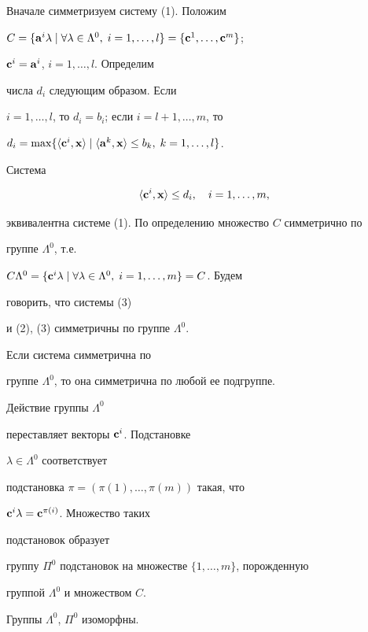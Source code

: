 Вначале симметризуем систему (1). Положим


$C=\{\bold a^i\lambda\mid\forall\lambda\in\Lambda^0,\;


i=1,\dotsc,l\}=\{\bold c^1,\dotsc,\bold c^m\}$;


$\bold c^i=\bold a^i$, $i=1,\dotsc,l$. Определим


числа $d_i$ следующим образом. Если


$i=1,\dotsc,l$, то $d_i=b_i$; если $i=l+1,\dotsc,m$, то


$d_i=\max\{\la\bold c^i,\bold x\ra\mid\la\bold a^k,\bold x\ra\le b_k,\;


k=1,\dotsc,l\}$.


Система


\begin{equation}


\la\bold c^i,\bold x\ra\le d_i,\quad i=1,\dotsc,m,


\end{equation}


эквивалентна системе (1). По определению множество $C$ симметрично по


группе $\Lambda^0$, т.е.


$C\Lambda^0=\{\bold c^i\lambda\mid\forall\lambda\in\Lambda^0,\;


i=1,\dotsc,m\}=C$. Будем


говорить, что системы (3)


и (2), (3) симметричны по группе $\Lambda^0$.


Если система симметрична по


группе $\Lambda^0$, то она симметрична по любой ее подгруппе.





Действие группы $\Lambda^0$


переставляет векторы $\bold c^i$. Подстановке


$\lambda\in\Lambda^0$ соответствует


подстановка $\pi=(\pi(1),\dotsc,\pi(m))$ такая, что


$\bold c^i\lambda=\bold c^{\pi(i)}$. Множество таких


подстановок образует


группу $\Pi^0$ подстановок на множестве $\{1,\dotsc,m\}$, порожденную


группой $\Lambda^0$ и множеством $C$.





\begin{lem}


Группы $\Lambda^0$, $\Pi^0$ изоморфны.


\end{lem}





